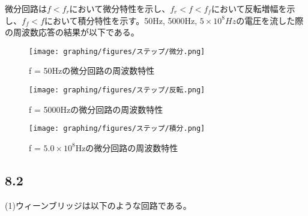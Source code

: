 \documentclass{ltjsarticle}
\begin{document}
微分回路は$f < f_r$において微分特性を示し、$f_r < f < f_f$において反転増幅を示し、$f_f < f$において積分特性を示す。50Hz, 5000Hz, $5\times10^8Hz$の電圧を流した際の周波数応答の結果が以下である。
\begin{figure}[H]
    \begin{center}
        \texttt{[image: graphing/figures/ステップ/微分.png]}
        \caption{f = 50Hzの微分回路の周波数特性}
    \end{center}
\end{figure}

\begin{figure}[H]
    \begin{center}
        \texttt{[image: graphing/figures/ステップ/反転.png]}
        \caption{f = 5000Hzの微分回路の周波数特性}
    \end{center}
\end{figure}

\begin{figure}[H]
    \begin{center}
        \texttt{[image: graphing/figures/ステップ/積分.png]}
        \caption{f = $5.0\times 10^8$Hzの微分回路の周波数特性}
    \end{center}
\end{figure}

\subsection*{8.2}
(1)ウィーンブリッジは以下のような回路である。
\end{document}
